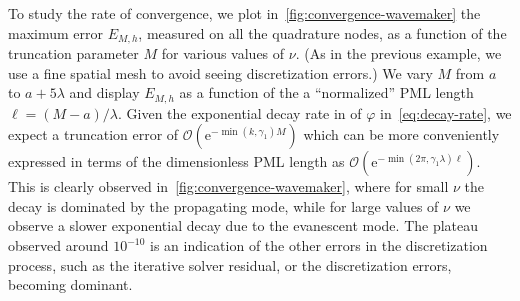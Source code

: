 \documentclass[review,hidelinks,onefignum,onetabnum]{siamart220329}
\newcommand{\e}{\mathrm{e}}
\begin{document}
To study the rate of convergence, we plot in~\cref{fig:convergence-wavemaker} the maximum error $E_{M,h}$, measured on all the quadrature nodes, as a function of the truncation parameter $M$ for various values of $\nu$. (As in the previous example, we use a fine spatial mesh to avoid seeing discretization errors.) We vary $M$ from $a$ to $a + 5 \lambda$ and display $E_{M,h}$ as a function of the a ``normalized'' PML length $\ell = (M-a)/\lambda$. Given the exponential decay rate in of $\varphi$ in~\cref{eq:decay-rate}, we expect a truncation error of $\mathcal{O}(\e^{-\min(k,\gamma_1)M})$ which can be more conveniently expressed in terms of the dimensionless PML length as $\mathcal{O}(\e^{-\min(2\pi,\gamma_1 \lambda) \ell} )$.  This is clearly observed in~\cref{fig:convergence-wavemaker}, where for small $\nu$ the decay is dominated by the propagating mode, while for large values of $\nu$ we observe a slower exponential decay due to the evanescent mode. The plateau observed around $10^{-10}$ is an indication of the other errors in the discretization process, such as the iterative solver residual, or the discretization errors, becoming dominant.
%
\end{document}
